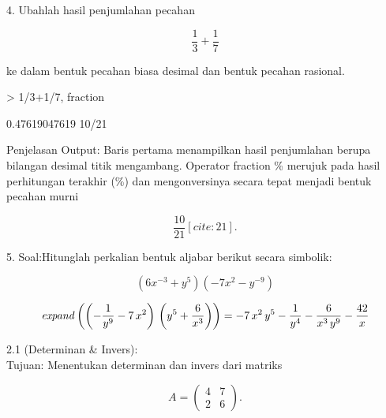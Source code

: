 \documentclass[a4paper,10pt]{article}
\begin{document}
\begin{eulernotebook}
\begin{eulercomment}
4. Ubahlah hasil penjumlahan pecahan\\
\end{eulercomment}
\begin{eulerformula}
\[
\frac{1}{3} + \frac{1}{7}
\]
\end{eulerformula}
\begin{eulercomment}
ke dalam bentuk pecahan biasa desimal dan bentuk pecahan rasional.
\end{eulercomment}
\begin{eulerprompt}
> 1/3+1/7, fraction %
\end{eulerprompt}
\begin{euleroutput}
  0.47619047619
  10/21
\end{euleroutput}
\begin{eulercomment}
Penjelasan Output: Baris pertama menampilkan hasil penjumlahan berupa
bilangan desimal titik mengambang. Operator fraction \% merujuk pada
hasil perhitungan terakhir (\%) dan mengonversinya secara tepat menjadi
bentuk pecahan murni \\
\end{eulercomment}
\begin{eulerformula}
\[
\frac{10}{21}[cite: 21].
\]
\end{eulerformula}
\begin{eulercomment}
5. Soal:Hitunglah perkalian bentuk aljabar berikut secara simbolik:\\
\end{eulercomment}
\begin{eulerformula}
\[
(6x^{-3} + y^5)(-7x^2 - y^{-9})
\]
\end{eulerformula}
\begin{eulerformula}
\[
{\it expand}\left(\left(-\frac{1}{y^9}-7\,x^2\right)\,\left(y^5+  \frac{6}{x^3}\right)\right)=-7\,x^2\,y^5-\frac{1}{y^4}-\frac{6}{x^3  \,y^9}-\frac{42}{x}
\]
\end{eulerformula}
\begin{eulercomment}
2.1 (Determinan \& Invers):\\
Tujuan: Menentukan determinan dan invers dari matriks\\
\end{eulercomment}
\begin{eulerformula}
\[
A = \begin{pmatrix} 4 & 7 \\ 2 & 6 \end{pmatrix}.
\]
\end{eulerformula}
\end{eulernotebook}
\end{document}
